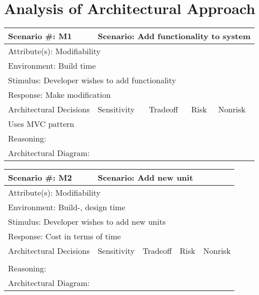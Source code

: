 \section{Analysis of Architectural Approach}

\begin{tabular}{|m{}|m{}|m{}|m{}|m{}|m{}|}
  \hline
  Scenario \#: M1 & \multicolumn{5}{m{0.75 \textwidth}|}{Scenario: Add functionality to system} \\ \hline
  \multicolumn{6}{|m{0.9 \textwidth}|}{Attribute(s): Modifiability} \\ \hline
  \multicolumn{6}{|m{0.9 \textwidth}|}{Environment: Build time} \\ \hline
  \multicolumn{6}{|m{0.9 \textwidth}|}{Stimulus: Developer wishes to add functionality} \\ \hline
  \multicolumn{6}{|m{0.9 \textwidth}|}{Response: Make modification} \\ \hline
  \multicolumn{2}{|m{0.3 \textwidth}|}{Architectural Decisions} & Sensitivity & Tradeoff & Risk & Nonrisk \\ \hline
  \multicolumn{2}{|m{0.3 \textwidth}|}{Uses MVC pattern} &  &  &  &  \\ \hline
  \multicolumn{6}{|m{0.9 \textwidth}|}{Reasoning:} \\ \hline
  \multicolumn{6}{|m{0.9 \textwidth}|}{Architectural Diagram: } \\ \hline
\end{tabular}

\begin{tabular}{|m{}|m{}|m{}|m{}|m{}|m{}|}
  \hline
  Scenario \#: M2 & \multicolumn{5}{m{0.75 \textwidth}|}{Scenario: Add new unit} \\ \hline
  \multicolumn{6}{|m{0.9 \textwidth}|}{Attribute(s): Modifiability} \\ \hline
  \multicolumn{6}{|m{0.9 \textwidth}|}{Environment: Build-, design time} \\ \hline
  \multicolumn{6}{|m{0.9 \textwidth}|}{Stimulus: Developer wishes to add new units} \\ \hline
  \multicolumn{6}{|m{0.9 \textwidth}|}{Response: Cost in terms of time} \\ \hline
  \multicolumn{2}{|m{0.3 \textwidth}|}{Architectural Decisions} & Sensitivity & Tradeoff & Risk & Nonrisk \\ \hline
  \multicolumn{2}{|m{0.3 \textwidth}|}{} &  &  &  &  \\ \hline
  \multicolumn{6}{|m{0.9 \textwidth}|}{Reasoning:} \\ \hline
  \multicolumn{6}{|m{0.9 \textwidth}|}{Architectural Diagram: } \\ \hline
\end{tabular}

